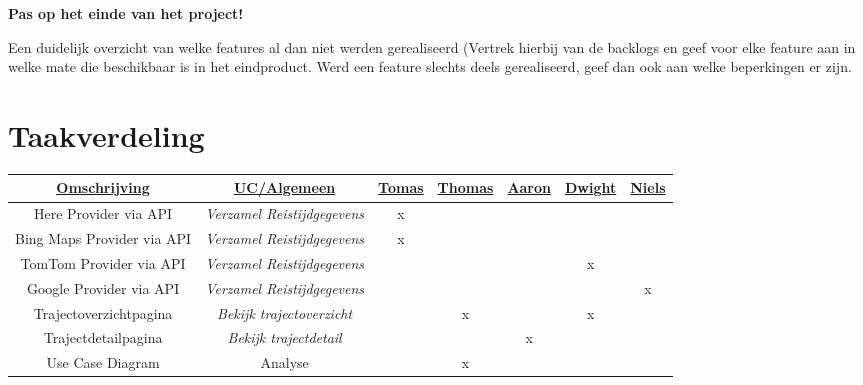 \documentclass[a4paper]{article}
\begin{document}
\textbf{Pas op het einde van het project!}

Een duidelijk overzicht van welke features al dan
niet werden gerealiseerd (Vertrek hierbij van de backlogs en
geef voor elke feature aan in welke mate die beschikbaar is in
het eindproduct. Werd een feature slechts deels gerealiseerd,
geef dan ook aan welke beperkingen er zijn.

\newpage
\section{Taakverdeling}
\label{sec:taakverdeling}


\begin{table}[H]
\centering
\begin{tabular}{|c|c|c|c|c|c|c|}
\hline
{\ul \textbf{Omschrijving}} & {\ul \textbf{UC/Algemeen}}         & {\ul \textbf{Tomas}} & {\ul \textbf{Thomas}} & {\ul \textbf{Aaron}} & {\ul \textbf{Dwight}} & {\ul \textbf{Niels}} \\ \hline
Here Provider via API       & \textit{Verzamel Reistijdgegevens} & x                    &                       &                      &                       &                      \\ \hline
Bing Maps Provider via API  & \textit{Verzamel Reistijdgegevens} & x                    &                       &                      &                       &                      \\ \hline
TomTom Provider via API     & \textit{Verzamel Reistijdgegevens} &                      &                       &                      & x                     &                      \\ \hline
Google Provider via API     & \textit{Verzamel Reistijdgegevens} &                      &                       &                      &                       & x                    \\ \hline
Trajectoverzichtpagina      & \textit{Bekijk trajectoverzicht}   &                      & x                     &                      & x                     &                      \\ \hline
Trajectdetailpagina         & \textit{Bekijk trajectdetail}      &                      &                       & x                    &                       &                      \\ \hline
Use Case Diagram            & Analyse                            &                      & x                     &                      &                       &                      \\ \hline

\end{tabular}
\end{table}
\end{document}
